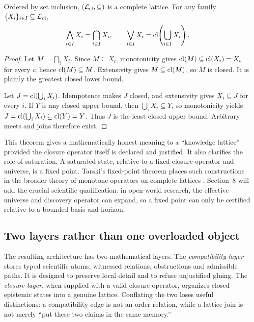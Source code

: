 \begin{theorem}
Ordered by set inclusion, \((\mathcal L_{\operatorname{cl}},\subseteq)\) is a complete lattice. For any family \(\{X_i\}_{i\in I}\subseteq\mathcal L_{\operatorname{cl}}\),
\[
\bigwedge_{i\in I}X_i=\bigcap_{i\in I}X_i,
\qquad
\bigvee_{i\in I}X_i=\operatorname{cl}\!\left(\bigcup_{i\in I}X_i\right).
\]
\end{theorem}

\begin{proof}
Let \(M=\bigcap_i X_i\). Since \(M\subseteq X_i\), monotonicity gives \(\operatorname{cl}(M)\subseteq\operatorname{cl}(X_i)=X_i\) for every \(i\); hence \(\operatorname{cl}(M)\subseteq M\). Extensivity gives \(M\subseteq\operatorname{cl}(M)\), so \(M\) is closed. It is plainly the greatest closed lower bound.

Let \(J=\operatorname{cl}(\bigcup_i X_i)\). Idempotence makes \(J\) closed, and extensivity gives \(X_i\subseteq J\) for every \(i\). If \(Y\) is any closed upper bound, then \(\bigcup_i X_i\subseteq Y\), so monotonicity yields \(J=\operatorname{cl}(\bigcup_i X_i)\subseteq\operatorname{cl}(Y)=Y\). Thus \(J\) is the least closed upper bound. Arbitrary meets and joins therefore exist.
\end{proof}

This theorem gives a mathematically honest meaning to a ``knowledge lattice'' provided the closure operator itself is declared and justified. It also clarifies the role of saturation. A saturated state, relative to a fixed closure operator and universe, is a fixed point. Tarski's fixed-point theorem places such constructions in the broader theory of monotone operators on complete lattices \cite{tarski1955}. Section~8 will add the crucial scientific qualification: in open-world research, the effective universe and discovery operator can expand, so a fixed point can only be certified relative to a bounded basis and horizon.

\subsection{Two layers rather than one overloaded object}

The resulting architecture has two mathematical layers. The \emph{compatibility layer} stores typed scientific atoms, witnessed relations, obstructions and admissible paths. It is designed to preserve local detail and to refuse unjustified gluing. The \emph{closure layer}, when supplied with a valid closure operator, organizes closed epistemic states into a genuine lattice. Conflating the two loses useful distinctions: a compatibility edge is not an order relation, while a lattice join is not merely ``put these two claims in the same memory.''

